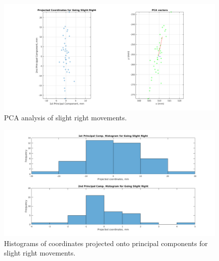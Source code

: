 \documentclass[paper=a4, fontsize=11pt]{scrartcl} %
\begin{document}
    \begin{figure}[h!]
        \begin{center}
            \setlength{\fboxsep}{0.5pt} %
            \setlength{\fboxrule}{0.5pt}
            \includegraphics[width=\linewidth,fbox]{images/pca_slightRight.png}
            \caption{PCA analysis of slight right movements.}
        \end{center}
    \end{figure}

    \begin{figure}[h!]
        \begin{center}
            \setlength{\fboxsep}{0.5pt} %
            \setlength{\fboxrule}{0.5pt}
            \includegraphics[width=\linewidth,fbox]{images/pca_histogram_slightRight.png}
            \caption{Histograms of coordinates projected onto principal components for slight right movements.}
        \end{center}
    \end{figure}
\end{document}
